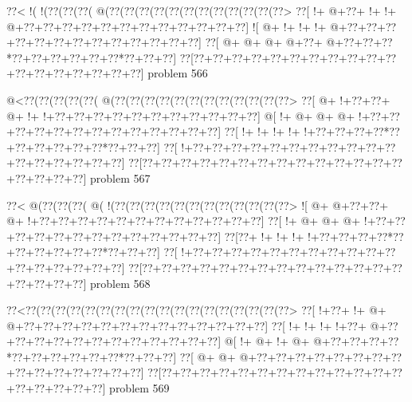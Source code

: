 \vbox{\vbox{\goo
\0??<\- !(\- !(\0??(\0??(\0??(\- @(\0??(\0??(\0??(\0??(\0??(\0??(\0??(\0??(\0??(\0??(\0??(\0??>
\0??[\- !+\- @+\0??+\- !+\- !+\- @+\0??+\0??+\0??+\0??+\0??+\0??+\0??+\0??+\0??+\0??+\0??+\0??]
\- ![\- @+\- !+\- !+\- !+\- @+\0??+\0??+\0??+\0??+\0??+\0??+\0??+\0??+\0??+\0??+\0??+\0??+\0??]
\0??[\- @+\- @+\- @+\- @+\0??+\- @+\0??+\0??+\0??*\0??+\0??+\0??+\0??+\0??+\0??*\0??+\0??+\0??]
\0??[\0??+\0??+\0??+\0??+\0??+\0??+\0??+\0??+\0??+\0??+\0??+\0??+\0??+\0??+\0??+\0??+\0??+\0??]
}
\hfil problem 566\hfil\break
}



\vbox{\vbox{\goo
\- @<\0??(\0??(\0??(\0??(\0??(\- @(\0??(\0??(\0??(\0??(\0??(\0??(\0??(\0??(\0??(\0??(\0??(\0??>
\0??[\- @+\- !+\0??+\0??+\- @+\- !+\- !+\0??+\0??+\0??+\0??+\0??+\0??+\0??+\0??+\0??+\0??+\0??]
\- @[\- !+\- @+\- @+\- @+\- !+\0??+\0??+\0??+\0??+\0??+\0??+\0??+\0??+\0??+\0??+\0??+\0??+\0??]
\0??[\- !+\- !+\- !+\- !+\- !+\0??+\0??+\0??+\0??*\0??+\0??+\0??+\0??+\0??+\0??*\0??+\0??+\0??]
\0??[\- !+\0??+\0??+\0??+\0??+\0??+\0??+\0??+\0??+\0??+\0??+\0??+\0??+\0??+\0??+\0??+\0??+\0??]
\0??[\0??+\0??+\0??+\0??+\0??+\0??+\0??+\0??+\0??+\0??+\0??+\0??+\0??+\0??+\0??+\0??+\0??+\0??]
}
\hfil problem 567\hfil\break
}



\vbox{\vbox{\goo
\0??<\- @(\0??(\0??(\0??(\- @(\- !(\0??(\0??(\0??(\0??(\0??(\0??(\0??(\0??(\0??(\0??(\0??(\0??>
\- ![\- @+\- @+\0??+\0??+\- @+\- !+\0??+\0??+\0??+\0??+\0??+\0??+\0??+\0??+\0??+\0??+\0??+\0??]
\0??[\- !+\- @+\- @+\- @+\- !+\0??+\0??+\0??+\0??+\0??+\0??+\0??+\0??+\0??+\0??+\0??+\0??+\0??]
\0??[\0??+\- !+\- !+\- !+\- !+\0??+\0??+\0??+\0??*\0??+\0??+\0??+\0??+\0??+\0??*\0??+\0??+\0??]
\0??[\- !+\0??+\0??+\0??+\0??+\0??+\0??+\0??+\0??+\0??+\0??+\0??+\0??+\0??+\0??+\0??+\0??+\0??]
\0??[\0??+\0??+\0??+\0??+\0??+\0??+\0??+\0??+\0??+\0??+\0??+\0??+\0??+\0??+\0??+\0??+\0??+\0??]
}
\hfil problem 568\hfil\break
}



\vbox{\vbox{\goo
\0??<\0??(\0??(\0??(\0??(\0??(\0??(\0??(\0??(\0??(\0??(\0??(\0??(\0??(\0??(\0??(\0??(\0??(\0??>
\0??[\- !+\0??+\- !+\- @+\- @+\0??+\0??+\0??+\0??+\0??+\0??+\0??+\0??+\0??+\0??+\0??+\0??+\0??]
\0??[\- !+\- !+\- !+\- !+\0??+\- @+\0??+\0??+\0??+\0??+\0??+\0??+\0??+\0??+\0??+\0??+\0??+\0??]
\- @[\- !+\- @+\- !+\- @+\- @+\0??+\0??+\0??+\0??*\0??+\0??+\0??+\0??+\0??+\0??*\0??+\0??+\0??]
\0??[\- @+\- @+\- @+\0??+\0??+\0??+\0??+\0??+\0??+\0??+\0??+\0??+\0??+\0??+\0??+\0??+\0??+\0??]
\0??[\0??+\0??+\0??+\0??+\0??+\0??+\0??+\0??+\0??+\0??+\0??+\0??+\0??+\0??+\0??+\0??+\0??+\0??]
}
\hfil problem 569\hfil\break
}



